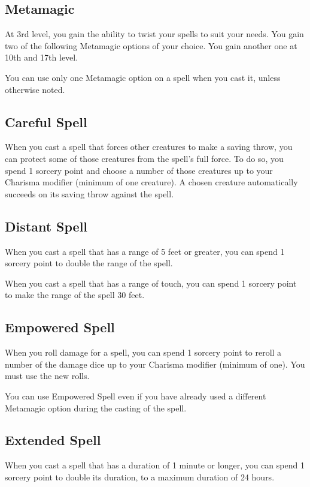 \subsection{Metamagic}

At 3rd level, you gain the ability to twist your spells to suit your needs. You gain two of the following Metamagic options of your choice. You gain another one at 10th and 17th level.

You can use only one Metamagic option on a spell when you cast it, unless otherwise noted.

\subsection{Careful Spell}

When you cast a spell that forces other creatures to make a saving throw, you can protect some of those creatures from the spell’s full force. To do so, you spend 1 sorcery point and choose a number of those creatures up to your Charisma modifier (minimum of one creature). A chosen creature automatically succeeds on its saving throw against the spell.

\subsection{Distant Spell}

When you cast a spell that has a range of 5 feet or greater, you can spend 1 sorcery point to double the range of the spell.

When you cast a spell that has a range of touch, you can spend 1 sorcery point to make the range of the spell 30 feet.

\subsection{Empowered Spell}

When you roll damage for a spell, you can spend 1 sorcery point to reroll a number of the damage dice up to your Charisma modifier (minimum of one). You must use the new rolls.

You can use Empowered Spell even if you have already used a different Metamagic option during the casting of the spell.

\subsection{Extended Spell}

When you cast a spell that has a duration of 1 minute or longer, you can spend 1 sorcery point to double its duration, to a maximum duration of 24 hours.

